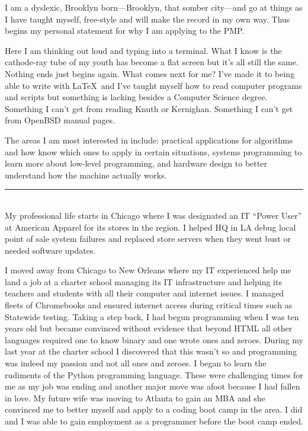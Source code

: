 \documentclass{article}
\begin{document}
I am a dyslexic, Brooklyn born---Brooklyn, that somber city---and go at things as I have taught myself, free-style and will make the record in my own way. Thus begins my personal statement for why I am applying to the PMP.

Here I am thinking out loud and typing into a terminal. What I know is the cathode-ray tube of my youth has become a flat screen but it's all still the same. Nothing ends just begins again. What comes next for me? I've made it to being able to write with \LaTeX\ and I've taught myself how to read computer programs and scripts but something is lacking besides a Computer Science degree. Something I can't get from reading Knuth or Kernighan. Something I can't get from OpenBSD manual pages.

The areas I am most interested in include: practical applications for algorithms and how know which ones to apply in certain situations, systems programming to learn more about low-level programming, and hardware design to better understand how the machine actually works.\\

\hrule\
\\

My professional life starts in Chicago where I was designated an IT ``Power User'' at American Apparel for its stores in the region. I helped HQ in LA debug local point of sale system failures and replaced store servers when they went bust or needed software updates.

I moved away from Chicago to New Orleans where my IT experienced help me land a job at a charter school managing its IT infrastructure and helping its teachers and students with all their computer and internet issues. I managed fleets of Chromebooks and ensured internet access during critical times such as Statewide testing. Taking a step back, I had begun programming when I was ten years old but became convinced without evidence that beyond HTML all other languages required one to know binary and one wrote ones and zeroes. During my last year at the charter school I discovered that this wasn't so and programming was indeed my passion and not all ones and zeroes. I began to learn the rudiments of the Python programming language. These were challenging times for me as my job was ending and another major move was afoot because I had fallen in love. My future wife was moving to Atlanta to gain an MBA and she convinced me to better myself and apply to a coding boot camp in the area. I did and I was able to gain employment as a programmer before the boot camp ended.
\end{document}
